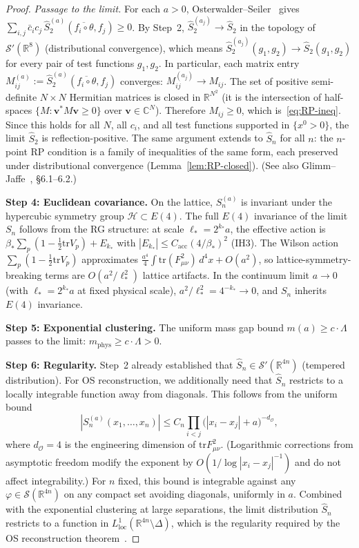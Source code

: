\documentclass[11pt]{article}
\theoremstyle{definition}
\newcommand{\tr}{\mathrm{tr}}
\newcommand{\R}{\mathbb{R}}
\begin{document}
\begin{proof}
\emph{Passage to the limit.}
For each $a>0$, Osterwalder--Seiler~\cite{OS78} gives
$\sum_{i,j}\bar c_i c_j\,
\hat S_2^{(a)}(\overline{f_i\circ\theta},f_j)\ge 0$.
By Step~2, $\hat S_2^{(a_j)}\to\hat S_2$ in the
topology of $\mathcal{S}'(\R^8)$
(distributional convergence), which means
$\hat S_2^{(a_j)}(g_1,g_2)\to\hat S_2(g_1,g_2)$
for every pair of test functions $g_1,g_2$.
In particular, each matrix entry
$M_{ij}^{(a)}:=\hat S_2^{(a)}
(\overline{f_i\circ\theta},f_j)$
converges: $M_{ij}^{(a_j)}\to M_{ij}$.
The set of positive semi-definite $N\times N$
Hermitian matrices is closed in $\R^{N^2}$
(it is the intersection of half-spaces
$\{M:\mathbf{v}^*M\mathbf{v}\ge 0\}$ over
$\mathbf{v}\in\mathbb{C}^N$).
Therefore $M_{ij}\ge 0$, which is~\eqref{eq:RP-ineq}.
Since this holds for all $N$, all $c_i$, and all test
functions supported in $\{x^0>0\}$, the limit
$\hat S_2$ is reflection-positive.
The same argument extends to $\hat S_n$ for all $n$:
the $n$-point RP condition is a family of inequalities
of the same form, each preserved under distributional
convergence (Lemma~\ref{lem:RP-closed}).
(See also Glimm--Jaffe~\cite{GlimmJaffe}, \S6.1--6.2.)

\textbf{Step 4: Euclidean covariance.}
On the lattice, $S_n^{(a)}$ is invariant under the
hypercubic symmetry group $\mathcal{H}\subset E(4)$.
The full $E(4)$ invariance of the limit $S_n$ follows from
the RG structure: at scale $\ell_*=2^{k_*}a$, the effective
action is $\beta_*\sum_p(1-\frac{1}{2}\tr V_p)+E_{k_*}$
with $|E_{k_*}|\le C_{\mathrm{acc}}(4/\beta_*)^2$ (IH3).
The Wilson action $\sum_p(1-\frac{1}{2}\tr V_p)$ approximates
$\frac{a^4}{4}\int\tr(F_{\mu\nu}^2)\,d^4x+O(a^2)$, so
lattice-symmetry-breaking terms are $O(a^2/\ell_*^2)$
lattice artifacts.  In the continuum limit $a\to 0$
(with $\ell_*=2^{k_*}a$ at fixed physical scale),
$a^2/\ell_*^2=4^{-k_*}\to 0$, and $S_n$ inherits
$E(4)$ invariance.

\textbf{Step 5: Exponential clustering.}
The uniform mass gap bound
$m(a)\ge c\cdot\Lambda$ passes to the limit:
$m_{\mathrm{phys}}\ge c\cdot\Lambda>0$.

\textbf{Step 6: Regularity.}
Step~2 already established that $\hat S_n\in\mathcal{S}'(\R^{4n})$
(tempered distribution).  For OS reconstruction, we additionally
need that $\hat S_n$ restricts to a locally integrable function
away from diagonals.  This follows from the uniform bound
\begin{equation}
|S_n^{(a)}(x_1,\ldots,x_n)|\le C_n\prod_{i<j}
\bigl(|x_i-x_j|+a\bigr)^{-d_\mathcal{O}},
\end{equation}
where $d_\mathcal{O}=4$ is the engineering dimension of
$\tr F_{\mu\nu}^2$.  (Logarithmic corrections from
asymptotic freedom modify the exponent by
$O(1/\log|x_i-x_j|^{-1})$ and do not affect integrability.)
For $n$ fixed, this bound is integrable against any
$\varphi\in\mathcal{S}(\R^{4n})$ on any compact set avoiding
diagonals, uniformly in $a$.  Combined with the exponential
clustering at large separations, the limit distribution
$\hat S_n$ restricts to a function in
$L^1_{\mathrm{loc}}(\R^{4n}\setminus\Delta)$, which is
the regularity required by the OS reconstruction
theorem~\cite{OS73}.
\end{proof}
\end{document}
